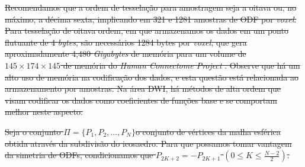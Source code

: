 \documentclass[
    12pt,                %
    oneside,            %
    a4paper,            %
    english,            %
    french,                %
    spanish,            %
    brazil                %
    ]{abntex2}
\begin{document}
\sout{
Recomendamos que a ordem de tesselação para amostragem seja a oitava ou, no máximo, a décima sexta, implicando em 321 e 1281 amostras de ODF por \textit{voxel}. Para tesselação de oitava ordem, em que armazenamos os dados em um ponto flutuante de 4 \textit{bytes}, são necessários 1284 bytes por \textit{voxel}, que gera aproximadamente 4,480 \textit{Gigabytes} de memória para um volume de $145 \times 174 \times 145$ de memória do \textit{Human Connectome Project} \cite{essen2012}. Observe que há um alto uso de memória na codificação dos dados, e esta questão está relacionada ao armazenamento por amostras. Na área DWI, há métodos de alta ordem que visam codificar os dados como coeficientes de funções base \cite{descoteaux2007_QBI, tournier2007} e se comportam melhor neste aspecto.
}



\sout{
Seja o conjunto $\Pi = \{P_1, P_2, \dots, P_N\}$o conjunto de vértices da malha esférica obtida através da subdivisão do icosaedro. Para que possamos tomar vantagem da simetria de ODFs, condicionamos que $P_{2K+2} = -P_{2K+1}$ $(0 \leq K \leq \frac{N-2}{2})$.
}
\end{document}
